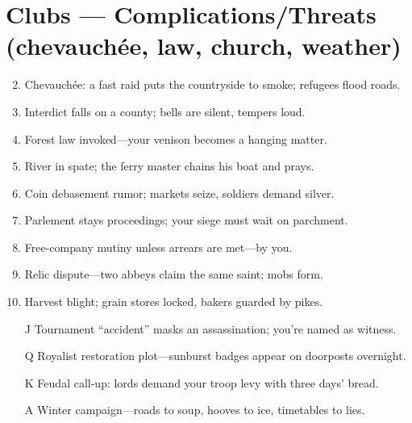 \section*{Clubs --- Complications/Threats (chevauchée, law, church, weather)}
\label{sec:vhasia-complications}
\begin{enumerate}
\setcounter{enumi}{1}
\item Chevauchée: a fast raid puts the countryside to smoke; refugees flood roads.
\item Interdict falls on a county; bells are silent, tempers loud.
\item Forest law invoked---your venison becomes a hanging matter.
\item River in spate; the ferry master chains his boat and prays.
\item Coin debasement rumor; markets seize, soldiers demand silver.
\item Parlement stays proceedings; your siege must wait on parchment.
\item Free-company mutiny unless arrears are met---by you.
\item Relic dispute---two abbeys claim the same saint; mobs form.
\item Harvest blight; grain stores locked, bakers guarded by pikes.
\item[J] Tournament ``accident'' masks an assassination; you're named as witness.
\item[Q] Royalist restoration plot---sunburst badges appear on doorposts overnight.
\item[K] Feudal call-up: lords demand your troop levy with three days' bread.
\item[A] Winter campaign---roads to soup, hooves to ice, timetables to lies.
\end{enumerate}

